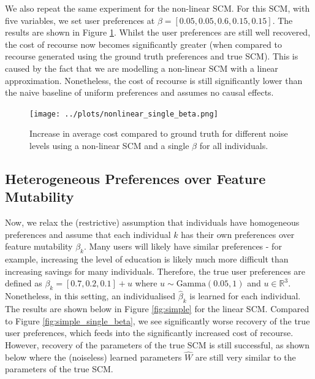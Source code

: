 We also repeat the same experiment for the non-linear SCM. For this SCM, with five variables, we set user preferences at $\beta = [0.05, 0.05, 0.6, 0.15, 0.15]$. The results are shown in Figure \ref{fig:nonlinear_single_beta}. Whilst the user preferences are still well recovered, the cost of recourse now becomes significantly greater (when compared to recourse generated using the ground truth preferences and true SCM). This is caused by the fact that we are modelling a non-linear SCM with a linear approximation. Nonetheless, the cost of recourse is still significantly lower than the naive baseline of uniform preferences and assumes no causal effects.

\begin{figure}[!htb]
	\centering
	\texttt{[image: ../plots/nonlinear\_single\_beta.png]}
	\caption{Increase in average cost compared to ground truth for different noise levels using a non-linear SCM and a single $\beta$ for all individuals.}
	\label{fig:nonlinear_single_beta}
\end{figure}

\subsection{Heterogeneous Preferences over Feature Mutability}

Now, we relax the (restrictive) assumption that individuals have homogeneous preferences and assume that each individual $k$ has their own preferences over feature mutability $\beta_k$. Many users will likely have similar preferences - for example, increasing the level of education is likely much more difficult than increasing savings for many individuals. Therefore, the true user preferences are defined as $\beta_k = [0.7, 0.2, 0.1] + u$ where $u \sim \text{Gamma}(0.05, 1)$ and $u \in \mathbb{R}^3$. Nonetheless, in this setting, an individualised $\hat{\beta}_k$ is learned for each individual.\\

The results are shown below in Figure \ref{fig:simple} for the linear SCM. Compared to Figure \ref{fig:simple_single_beta}, we see significantly worse recovery of the true user preferences, which feeds into the significantly increased cost of recourse. However, recovery of the parameters of the true SCM is still successful, as shown below where the (noiseless) learned parameters $\hat{W}$ are still very similar to the parameters of the true SCM.

